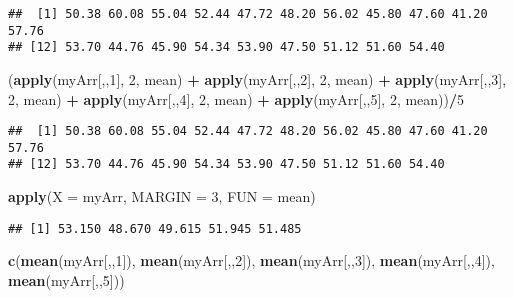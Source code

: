 \documentclass[]{book}
\newenvironment{Shaded}{\begin{snugshade}}{\end{snugshade}}
\newcommand{\KeywordTok}[1]{\textcolor[rgb]{0.13,0.29,0.53}{\textbf{#1}}}
\newcommand{\DataTypeTok}[1]{\textcolor[rgb]{0.13,0.29,0.53}{#1}}
\newcommand{\DecValTok}[1]{\textcolor[rgb]{0.00,0.00,0.81}{#1}}
\newcommand{\StringTok}[1]{\textcolor[rgb]{0.31,0.60,0.02}{#1}}
\newcommand{\OperatorTok}[1]{\textcolor[rgb]{0.81,0.36,0.00}{\textbf{#1}}}
\newcommand{\NormalTok}[1]{#1}
\theoremstyle{definition}
\theoremstyle{definition}
\theoremstyle{definition}
\theoremstyle{remark}
\begin{document}
\begin{verbatim}
##  [1] 50.38 60.08 55.04 52.44 47.72 48.20 56.02 45.80 47.60 41.20 57.76
## [12] 53.70 44.76 45.90 54.34 53.90 47.50 51.12 51.60 54.40
\end{verbatim}

\begin{Shaded}
\begin{Highlighting}[]
\NormalTok{(}\KeywordTok{apply}\NormalTok{(myArr[,,}\DecValTok{1}\NormalTok{], }\DecValTok{2}\NormalTok{, mean) }\OperatorTok{+}\StringTok{ }\KeywordTok{apply}\NormalTok{(myArr[,,}\DecValTok{2}\NormalTok{], }\DecValTok{2}\NormalTok{, mean) }\OperatorTok{+}\StringTok{ }
\StringTok{  }\KeywordTok{apply}\NormalTok{(myArr[,,}\DecValTok{3}\NormalTok{], }\DecValTok{2}\NormalTok{, mean) }\OperatorTok{+}\StringTok{ }\KeywordTok{apply}\NormalTok{(myArr[,,}\DecValTok{4}\NormalTok{], }\DecValTok{2}\NormalTok{, mean) }\OperatorTok{+}\StringTok{ }
\StringTok{  }\KeywordTok{apply}\NormalTok{(myArr[,,}\DecValTok{5}\NormalTok{], }\DecValTok{2}\NormalTok{, mean))}\OperatorTok{/}\DecValTok{5}
\end{Highlighting}
\end{Shaded}

\begin{verbatim}
##  [1] 50.38 60.08 55.04 52.44 47.72 48.20 56.02 45.80 47.60 41.20 57.76
## [12] 53.70 44.76 45.90 54.34 53.90 47.50 51.12 51.60 54.40
\end{verbatim}

\begin{Shaded}
\begin{Highlighting}[]
\KeywordTok{apply}\NormalTok{(}\DataTypeTok{X =}\NormalTok{ myArr, }\DataTypeTok{MARGIN =} \DecValTok{3}\NormalTok{, }\DataTypeTok{FUN =}\NormalTok{ mean)}
\end{Highlighting}
\end{Shaded}

\begin{verbatim}
## [1] 53.150 48.670 49.615 51.945 51.485
\end{verbatim}

\begin{Shaded}
\begin{Highlighting}[]
\KeywordTok{c}\NormalTok{(}\KeywordTok{mean}\NormalTok{(myArr[,,}\DecValTok{1}\NormalTok{]), }\KeywordTok{mean}\NormalTok{(myArr[,,}\DecValTok{2}\NormalTok{]), }\KeywordTok{mean}\NormalTok{(myArr[,,}\DecValTok{3}\NormalTok{]), }
  \KeywordTok{mean}\NormalTok{(myArr[,,}\DecValTok{4}\NormalTok{]), }\KeywordTok{mean}\NormalTok{(myArr[,,}\DecValTok{5}\NormalTok{]))}
\end{Highlighting}
\end{Shaded}
\end{document}
